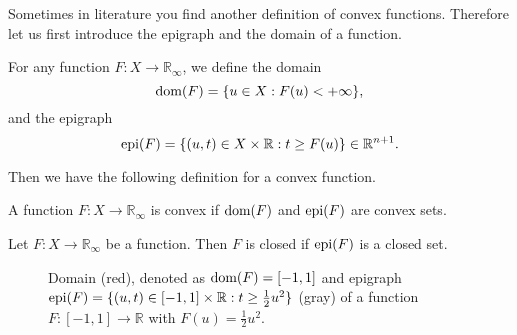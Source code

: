     Sometimes in literature you find another definition of convex functions. Therefore let us first introduce the epigraph and the domain of a function.

    \begin{definition} %
    \label{def:domain_epigraph}

        For any function $F: X \longrightarrow \mathbb{R}_{\infty}$, we define the domain
            \begin{equation}
                \textnormal{dom}(F) = \{ u \in X : F(u) < +\infty \},
                \label{eq:domain}
            \end{equation}
        and the epigraph
            \begin{equation}
                \textnormal{epi}(F) = \{ (u, t) \in X \times \mathbb{R}: t \ge F(u) \} \in \mathbb{R}^{n+1}.
                \label{eq:epigraph}
            \end{equation}
    \end{definition}

    Then we have the following definition for a convex function.

    \begin{definition} %
    \label{def:convex_function_else}

        A function $F: X \longrightarrow \mathbb{R}_{\infty}$ is convex if $\textnormal{dom}(F)$ and $\textnormal{epi}(F)$ are convex sets.

    \end{definition}

    \begin{definition} %
    \label{def:closed_function}

        Let $F: X \longrightarrow \mathbb{R}_{\infty}$ be a function. Then $F$ is closed if $\textnormal{epi}(F)$ is a closed set.

    \end{definition}

    \begin{figure}[ht]
        \centering
        \label{fig:domain_epigraph}
        \caption{Domain (red), denoted as $\textnormal{dom}(F) = [-1, 1]$ and epigraph \\$\textnormal{epi}(F) = \{(u, t) \in [-1, 1] \times \mathbb{R} : t \ge \frac{1}{2}u^{2}\}$ (gray) of a function $F: [-1, 1] \longrightarrow \mathbb{R}$ with $F(u) = \frac{1}{2}u^{2}$.}
    \end{figure}

